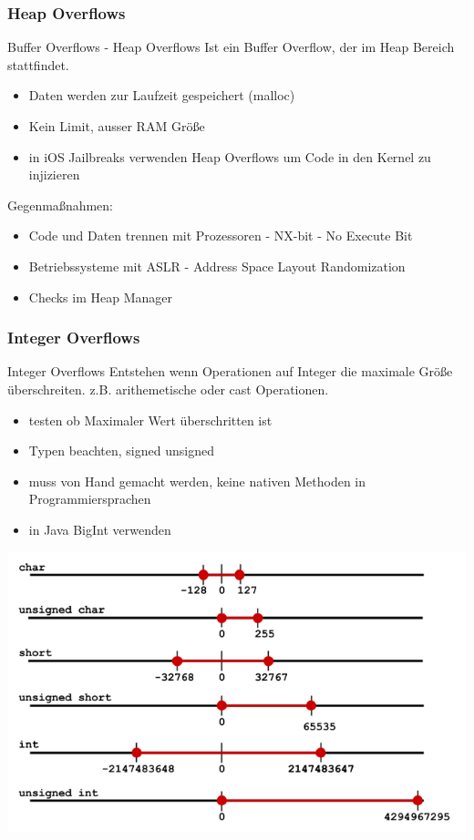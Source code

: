 \documentclass[10pt]{beamer}
\begin{document}
\subsubsection{Heap Overflows}

\begin{frame}[fragile]{Buffer Overflows - Heap Overflows}
  Ist ein Buffer Overflow, der im Heap Bereich stattfindet.
  \begin{itemize}
    \item Daten werden zur Laufzeit gespeichert (malloc)
    \item Kein Limit, ausser RAM Gr\"o{\ss}e
    \item in iOS Jailbreaks verwenden Heap Overflows um Code in den Kernel zu injizieren
  \end{itemize}
  Gegenma{\ss}nahmen:
  \begin{itemize}
    \item Code und Daten trennen mit Prozessoren - NX-bit - No Execute Bit
    \item Betriebssysteme mit ASLR - Address Space Layout Randomization
    \item Checks im Heap Manager
  \end{itemize}
\end{frame}

\subsubsection{Integer Overflows}

\begin{frame}[fragile]{Integer Overflows}
  Entstehen wenn Operationen auf Integer die maximale Gr\"o{\ss}e \"uberschreiten. z.B. arithemetische oder cast Operationen.
  \begin{itemize}
    \item testen ob Maximaler Wert \"uberschritten ist
    \item Typen beachten, signed unsigned
    \item muss von Hand gemacht werden, keine nativen Methoden in Programmiersprachen
    \item in Java BigInt verwenden
  \end{itemize}
  \includegraphics[scale=0.25]{integer_overflow}
\end{frame}
\end{document}

